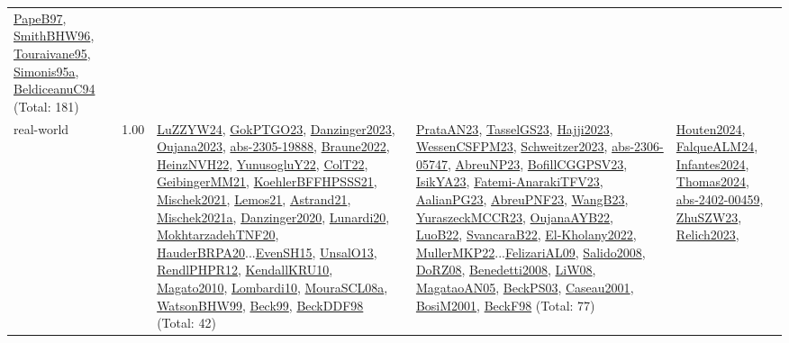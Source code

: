 {\begin{longtable}{p{3cm}r>{\raggedright\arraybackslash}p{6cm}>{\raggedright\arraybackslash}p{6cm}>{\raggedright\arraybackslash}p{8cm}}
\hyperref[detail:PapeB97]{PapeB97}, \hyperref[detail:SmithBHW96]{SmithBHW96}, \hyperref[detail:Touraivane95]{Touraivane95}, \hyperref[detail:Simonis95a]{Simonis95a}, \hyperref[detail:BeldiceanuC94]{BeldiceanuC94} (Total: 181)\\
\index{real-world}\index{Benchmarks!real-world}real-world &  1.00 & \hyperref[detail:LuZZYW24]{LuZZYW24}, \hyperref[detail:GokPTGO23]{GokPTGO23}, \hyperref[detail:Danzinger2023]{Danzinger2023}, \hyperref[detail:Oujana2023]{Oujana2023}, \hyperref[detail:abs-2305-19888]{abs-2305-19888}, \hyperref[detail:Braune2022]{Braune2022}, \hyperref[detail:HeinzNVH22]{HeinzNVH22}, \hyperref[detail:YunusogluY22]{YunusogluY22}, \hyperref[detail:ColT22]{ColT22}, \hyperref[detail:GeibingerMM21]{GeibingerMM21}, \hyperref[detail:KoehlerBFFHPSSS21]{KoehlerBFFHPSSS21}, \hyperref[detail:Mischek2021]{Mischek2021}, \hyperref[detail:Lemos21]{Lemos21}, \hyperref[detail:Astrand21]{Astrand21}, \hyperref[detail:Mischek2021a]{Mischek2021a}, \hyperref[detail:Danzinger2020]{Danzinger2020}, \hyperref[detail:Lunardi20]{Lunardi20}, \hyperref[detail:MokhtarzadehTNF20]{MokhtarzadehTNF20}, \hyperref[detail:HauderBRPA20]{HauderBRPA20}...\hyperref[detail:EvenSH15]{EvenSH15}, \hyperref[detail:UnsalO13]{UnsalO13}, \hyperref[detail:RendlPHPR12]{RendlPHPR12}, \hyperref[detail:KendallKRU10]{KendallKRU10}, \hyperref[detail:Magato2010]{Magato2010}, \hyperref[detail:Lombardi10]{Lombardi10}, \hyperref[detail:MouraSCL08a]{MouraSCL08a}, \hyperref[detail:WatsonBHW99]{WatsonBHW99}, \hyperref[detail:Beck99]{Beck99}, \hyperref[detail:BeckDDF98]{BeckDDF98} (Total: 42) & \hyperref[detail:PrataAN23]{PrataAN23}, \hyperref[detail:TasselGS23]{TasselGS23}, \hyperref[detail:Hajji2023]{Hajji2023}, \hyperref[detail:WessenCSFPM23]{WessenCSFPM23}, \hyperref[detail:Schweitzer2023]{Schweitzer2023}, \hyperref[detail:abs-2306-05747]{abs-2306-05747}, \hyperref[detail:AbreuNP23]{AbreuNP23}, \hyperref[detail:BofillCGGPSV23]{BofillCGGPSV23}, \hyperref[detail:IsikYA23]{IsikYA23}, \hyperref[detail:Fatemi-AnarakiTFV23]{Fatemi-AnarakiTFV23}, \hyperref[detail:AalianPG23]{AalianPG23}, \hyperref[detail:AbreuPNF23]{AbreuPNF23}, \hyperref[detail:WangB23]{WangB23}, \hyperref[detail:YuraszeckMCCR23]{YuraszeckMCCR23}, \hyperref[detail:OujanaAYB22]{OujanaAYB22}, \hyperref[detail:LuoB22]{LuoB22}, \hyperref[detail:SvancaraB22]{SvancaraB22}, \hyperref[detail:El-Kholany2022]{El-Kholany2022}, \hyperref[detail:MullerMKP22]{MullerMKP22}...\hyperref[detail:FelizariAL09]{FelizariAL09}, \hyperref[detail:Salido2008]{Salido2008}, \hyperref[detail:DoRZ08]{DoRZ08}, \hyperref[detail:Benedetti2008]{Benedetti2008}, \hyperref[detail:LiW08]{LiW08}, \hyperref[detail:MagataoAN05]{MagataoAN05}, \hyperref[detail:BeckPS03]{BeckPS03}, \hyperref[detail:Caseau2001]{Caseau2001}, \hyperref[detail:BosiM2001]{BosiM2001}, \hyperref[detail:BeckF98]{BeckF98} (Total: 77) & \hyperref[detail:Houten2024]{Houten2024}, \hyperref[detail:FalqueALM24]{FalqueALM24}, \hyperref[detail:Infantes2024]{Infantes2024}, \hyperref[detail:Thomas2024]{Thomas2024}, \hyperref[detail:abs-2402-00459]{abs-2402-00459}, \hyperref[detail:ZhuSZW23]{ZhuSZW23}, \hyperref[detail:Relich2023]{Relich2023}, 
\end{longtable}}
